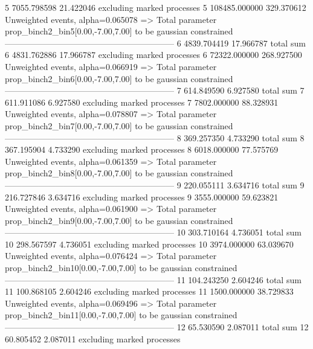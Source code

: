 5          7055.798598     21.422046       excluding marked processes    
5          108485.000000   329.370612      Unweighted events, alpha=0.065078
  => Total parameter prop_binch2_bin5[0.00,-7.00,7.00] to be gaussian constrained
------------------------------------------------------------
6          4839.704419     17.966787       total sum                     
6          4831.762886     17.966787       excluding marked processes    
6          72322.000000    268.927500      Unweighted events, alpha=0.066919
  => Total parameter prop_binch2_bin6[0.00,-7.00,7.00] to be gaussian constrained
------------------------------------------------------------
7          614.849590      6.927580        total sum                     
7          611.911086      6.927580        excluding marked processes    
7          7802.000000     88.328931       Unweighted events, alpha=0.078807
  => Total parameter prop_binch2_bin7[0.00,-7.00,7.00] to be gaussian constrained
------------------------------------------------------------
8          369.257350      4.733290        total sum                     
8          367.195904      4.733290        excluding marked processes    
8          6018.000000     77.575769       Unweighted events, alpha=0.061359
  => Total parameter prop_binch2_bin8[0.00,-7.00,7.00] to be gaussian constrained
------------------------------------------------------------
9          220.055111      3.634716        total sum                     
9          216.727846      3.634716        excluding marked processes    
9          3555.000000     59.623821       Unweighted events, alpha=0.061900
  => Total parameter prop_binch2_bin9[0.00,-7.00,7.00] to be gaussian constrained
------------------------------------------------------------
10         303.710164      4.736051        total sum                     
10         298.567597      4.736051        excluding marked processes    
10         3974.000000     63.039670       Unweighted events, alpha=0.076424
  => Total parameter prop_binch2_bin10[0.00,-7.00,7.00] to be gaussian constrained
------------------------------------------------------------
11         104.243250      2.604246        total sum                     
11         100.868105      2.604246        excluding marked processes    
11         1500.000000     38.729833       Unweighted events, alpha=0.069496
  => Total parameter prop_binch2_bin11[0.00,-7.00,7.00] to be gaussian constrained
------------------------------------------------------------
12         65.530590       2.087011        total sum                     
12         60.805452       2.087011        excluding marked processes    
